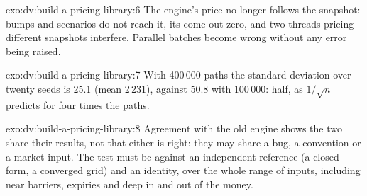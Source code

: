 \begin{solution}{exo:dv:build-a-pricing-library:6}
The engine's price no longer follows the snapshot: bumps and scenarios do not reach it, its  come out zero, and two threads pricing different snapshots
interfere. Parallel batches become wrong without any error being raised.
\end{solution}

\begin{solution}{exo:dv:build-a-pricing-library:7}
With 400\,000 paths the standard deviation over twenty seeds is 25.1 (mean 2\,231), against 50.8 with 100\,000: half, as $1/\sqrt n$ predicts for four times the paths.
\end{solution}

\begin{solution}{exo:dv:build-a-pricing-library:8}
Agreement with the old engine shows the two share their results, not that either is right: they may share a bug, a convention or a market input. The test must be
against an independent reference (a closed form, a converged grid) and an identity, over the whole range of inputs, including near barriers, expiries and
deep in and out of the money.
\end{solution}

